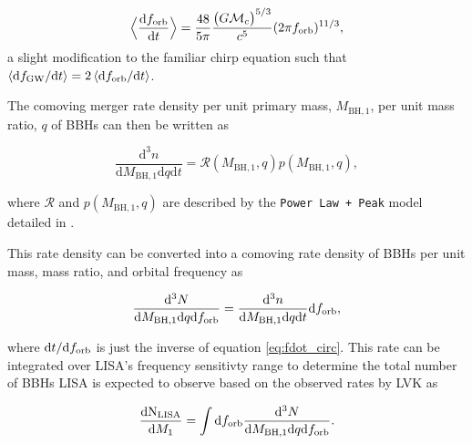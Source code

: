 \documentclass[twocolumn]{aastex631}
\begin{document}
\begin{equation}
    \Big\langle\frac{\mathrm{d}f_{\rm orb}}{\mathrm{d}t}\Big\rangle = \frac{48}{5 \pi} \frac{\big(G \mathcal{M}_c \big)^{5/3}}{c^5} (2 \pi f_{\rm orb})^{11/3}, 
    \label{eq:fdot_circ}
\end{equation}
\noindent a slight modification to the familiar chirp equation such that $\langle\mathrm{d}f_{\rm GW}/\mathrm{d}t\rangle = 2\,\langle\mathrm{d}f_{\rm orb}/\mathrm{d}t\rangle$. 

The comoving merger rate density per unit primary mass, $M_{\mathrm{BH,1}}$, per unit mass ratio, $q$ of BBHs can then be written as

\begin{equation}
    \frac{\mathrm{d}^3n}{\mathrm{d}M_{\mathrm{BH,1}} \mathrm{d}q \mathrm{d}t} = \mathcal{R}(M_{\mathrm{BH,1}}, q) p(M_{\mathrm{BH,1}}, q),
    \label{eq:merger_rate_density}
\end{equation}

\noindent where $\mathcal{R}$ and $p(M_{\mathrm{BH,1}}, q)$ are described by the \texttt{Power Law + Peak} model detailed in \cite{GWTC-3_pops_paper}. 

This rate density can be converted into a comoving rate density of BBHs per unit mass, mass ratio, and orbital frequency as

\begin{equation}
    \frac{\mathrm{d}^3N}{\mathrm{d}M_{\mathrm{BH,1}} \mathrm{d}q \mathrm{d}f_{\rm orb}} = \frac{\mathrm{d}^3n}{\mathrm{d}M_{\mathrm{BH,1}} \mathrm{d}q \mathrm{d}t}{\mathrm{d}f_{\rm orb}},
    \label{eq:rate_per_freq}
\end{equation}

where $\mathrm{d}t / \mathrm{d}f_{\rm orb}$ is just the inverse of equation \ref{eq:fdot_circ}. This rate can be integrated over LISA's frequency sensitivty range to determine the total number of BBHs LISA is expected to observe based on the observed rates by LVK as

\begin{equation}
    \frac{\mathrm{dN_{LISA}}}{\mathrm{d}M_1}= \int\mathrm{d}f_{\rm orb} \frac{\mathrm{d}^3N}{\mathrm{d}M_{\mathrm{BH,1}} \mathrm{d}q \mathrm{d}f_{\rm orb}}.
    \label{eq:LISA_rate_density_no_selection}
\end{equation}
\end{document}
